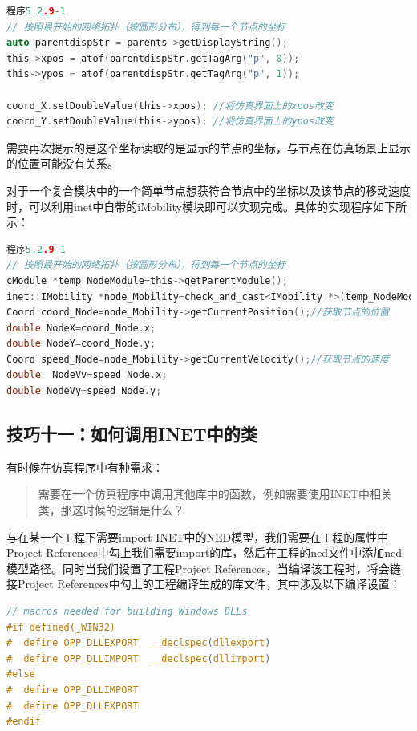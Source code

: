 \begin{lstlisting}[language=c]
程序5.2.9-1
// 按照最开始的网络拓扑（按圆形分布），得到每一个节点的坐标
auto parentdispStr = parents->getDisplayString();
this->xpos = atof(parentdispStr.getTagArg("p", 0));
this->ypos = atof(parentdispStr.getTagArg("p", 1));

coord_X.setDoubleValue(this->xpos); //将仿真界面上的xpos改变
coord_Y.setDoubleValue(this->ypos); //将仿真界面上的ypos改变
\end{lstlisting}

需要再次提示的是这个坐标读取的是显示的节点的坐标，与节点在仿真场景上显示的位置可能没有关系。

对于一个复合模块中的一个简单节点想获符合节点中的坐标以及该节点的移动速度时，可以利用inet中自带的iMobility模块即可以实现完成。具体的实现程序如下所示：

\begin{lstlisting}[language=c]
程序5.2.9-1
// 按照最开始的网络拓扑（按圆形分布），得到每一个节点的坐标
cModule *temp_NodeModule=this->getParentModule();
inet::IMobility *node_Mobility=check_and_cast<IMobility *>(temp_NodeModule->getSubmodule("mobility"));
Coord coord_Node=node_Mobility->getCurrentPosition();//获取节点的位置
double NodeX=coord_Node.x;
double NodeY=coord_Node.y;
Coord speed_Node=node_Mobility->getCurrentVelocity();//获取节点的速度
double  NodeVv=speed_Node.x;
double NodeVy=speed_Node.y;
\end{lstlisting}

\subsection{技巧十一：如何调用INET中的类}
\label{技巧十一：如何调用inet中的类}

有时候在仿真程序中有种需求：

\begin{quote}
需要在一个仿真程序中调用其他库中的函数，例如需要使用INET中相关类，那这时候的逻辑是什么？
\end{quote}

与在某一个工程下需要import INET中的NED模型，我们需要在工程的属性中Project References中勾上我们需要import的库，然后在工程的ned文件中添加ned模型路径。同时当我们设置了工程Project References，当编译该工程时，将会链接Project References中勾上的工程编译生成的库文件，其中涉及以下编译设置：

\begin{lstlisting}[language=c]
// macros needed for building Windows DLLs
#if defined(_WIN32)
#  define OPP_DLLEXPORT  __declspec(dllexport)
#  define OPP_DLLIMPORT  __declspec(dllimport)
#else
#  define OPP_DLLIMPORT
#  define OPP_DLLEXPORT
#endif

\end{lstlisting}


